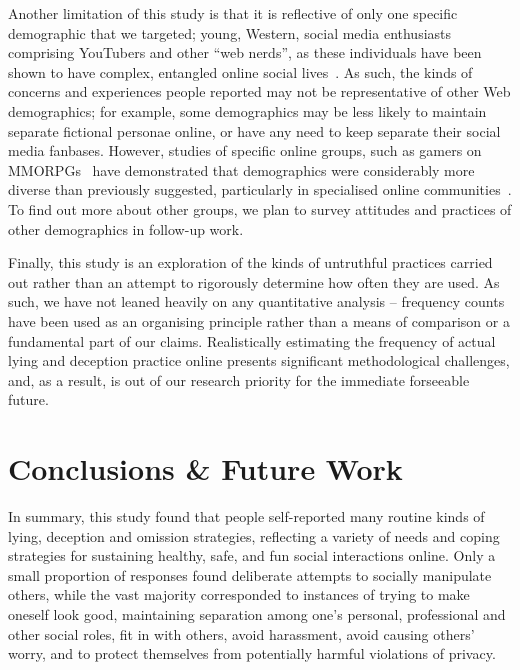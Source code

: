 \documentclass{sig-alternate}
\newcommand{\todo}[1]{\textbf{\color{red}TODO: #1}}
\begin{document}
Another limitation of this study is that it is reflective of only one specific demographic that we targeted; young, Western, social media enthusiasts comprising YouTubers and other ``web nerds'', as these individuals have been shown to have complex, entangled online social lives~\cite{boyd2014,livingstone2008taking,lenhart2008teens, lenhart2010social, madden2013teens}.  As such,  the kinds of concerns and experiences people reported may not be representative of other Web demographics; for example, some demographics may be less likely to maintain separate fictional personae online, or have any need to keep separate their social media fanbases. However, studies of specific online groups, such as gamers on MMORPGs~\cite{yee2006demographics} have demonstrated that demographics were considerably more diverse than previously suggested, particularly in specialised online communities~\cite{chan2011virtual}. To find out more about other groups, we plan to survey attitudes and practices of other demographics in follow-up work.

Finally, this study is an exploration of the kinds of untruthful practices carried out rather than an attempt to rigorously determine how often they are used. As such, we have not leaned heavily on any quantitative analysis -- frequency counts have been used as an organising principle rather than a means of comparison or a fundamental part of our claims.  Realistically estimating the frequency of actual lying and deception practice online presents significant methodological challenges, and, as a result, is out of our research priority for the immediate forseeable future.  


\section{Conclusions \& Future Work}

In summary, this study found that people self-reported many routine kinds of lying, deception and omission strategies, reflecting a variety of needs and coping strategies for sustaining healthy, safe, and fun social interactions online.  Only a small proportion of responses found deliberate attempts to socially manipulate others, while the vast majority corresponded to instances of trying to make oneself look good, maintaining separation among one's personal, professional and other social roles, fit in with others, avoid harassment, avoid causing others' worry, and to protect themselves from potentially harmful violations of privacy. 
\end{document}
